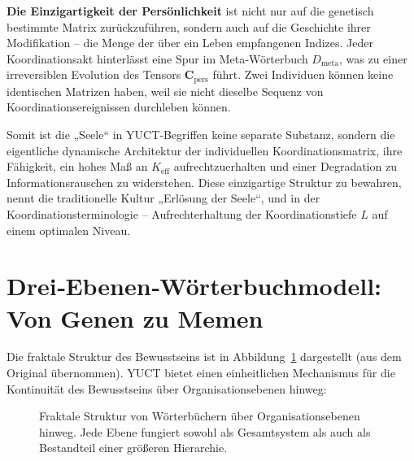 \documentclass[12pt,a4paper]{article}
\begin{document}
	\textbf{Die Einzigartigkeit der Persönlichkeit} ist nicht nur auf die genetisch bestimmte Matrix zurückzuführen, sondern auch auf die Geschichte ihrer Modifikation – die Menge der über ein Leben empfangenen Indizes. Jeder Koordinationsakt hinterlässt eine Spur im Meta‑Wörterbuch $D_{\text{meta}}$, was zu einer irreversiblen Evolution des Tensors $\mathbf{C}_{\text{pers}}$ führt. Zwei Individuen können keine identischen Matrizen haben, weil sie nicht dieselbe Sequenz von Koordinationsereignissen durchleben können.
	
	Somit ist die „Seele“ in YUCT‑Begriffen keine separate Substanz, sondern die eigentliche dynamische Architektur der individuellen Koordinationsmatrix, ihre Fähigkeit, ein hohes Maß an $K_{\mathrm{eff}}$ aufrechtzuerhalten und einer Degradation zu Informationsrauschen zu widerstehen. Diese einzigartige Struktur zu bewahren, nennt die traditionelle Kultur „Erlösung der Seele“, und in der Koordinationsterminologie – Aufrechterhaltung der Koordinationstiefe $L$ auf einem optimalen Niveau.
	
	\section{Drei‑Ebenen‑Wörterbuchmodell: Von Genen zu Memen}
	
	Die fraktale Struktur des Bewusstseins ist in Abbildung~\ref{fig:fractal_dict} dargestellt (aus dem Original übernommen). YUCT bietet einen einheitlichen Mechanismus für die Kontinuität des Bewusstseins über Organisationsebenen hinweg:
	
	\begin{figure}[htbp]
		\centering
		\caption{Fraktale Struktur von Wörterbüchern über Organisationsebenen hinweg. Jede Ebene fungiert sowohl als Gesamtsystem als auch als Bestandteil einer größeren Hierarchie.}
		\label{fig:fractal_dict}
	\end{figure}
	
\end{document}
